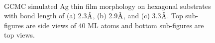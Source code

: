 \begingroup
\begin{figure}[!ht]
  \centering
  \label{Chap:Ag/ZnO:fig:5a}
  \label{Chap:Ag/ZnO:fig:5b}\\
  \label{Chap:Ag/ZnO:fig:5c}
\caption[GCMC simulated Ag thin film morphology on hexagonal substrates.]{GCMC simulated Ag thin film morphology on hexagonal substrates with bond length of (a) 2.3$\mbox{\normalfont\AA}$, (b) 2.9$\mbox{\normalfont\AA}$, and (c) 3.3$\mbox{\normalfont\AA}$. Top sub-figures are side views of 40 \ac{ML} atoms and bottom sub-figures are top views.}
  \label{Chap:Ag/ZnO:fig5}
\end{figure}
\endgroup

